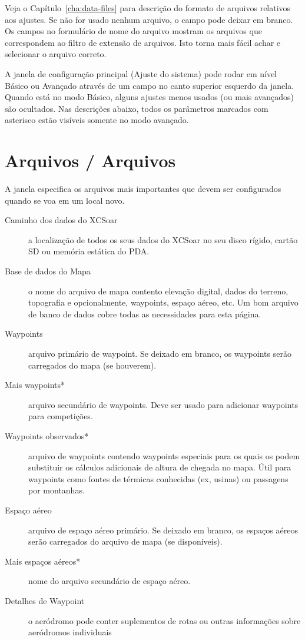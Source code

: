 Veja o Capítulo~\ref{cha:data-files} para descrição do formato de arquivos relativos aos ajustes.  Se não for usado nenhum arquivo, o campo pode deixar em branco.  Os campos no formulário de nome do arquivo mostram os arquivos que correspondem ao filtro de extensão de arquivos.  Isto torna mais fácil achar e selecionar o arquivo correto.

A janela de configuração principal (Ajuste do sistema) pode rodar em nível Básico ou Avançado através de um campo no canto superior esquerdo da janela.  
Quando está no modo Básico, alguns ajustes menos usados (ou mais avançados) são ocultados.  Nas descrições abaixo, todos os parâmetros marcados com asterisco estão visíveis somente no modo avançado.

\section{Arquivos / Arquivos}
A janela especifica os arquivos mais importantes que devem ser configurados quando se voa em um local novo.

\begin{description}
\item[Caminho dos dados do XCSoar]  a localização de todos os seus dados do XCSoar no seu disco rígido, cartão SD ou memória estática do PDA.
\item[Base de dados do Mapa]  o nome do arquivo de mapa contento elevação digital, dados do terreno, topografia e opcionalmente, waypoints, espaço aéreo, etc.  Um bom arquivo de banco de dados cobre todas as necessidades para esta página.
\item[Waypoints]  arquivo primário de waypoint.  Se deixado em branco, os waypoints serão carregados do mapa (se houverem).
\item[Mais waypoints*]  arquivo secundário de waypoints.  Deve ser usado para adicionar waypoints para competições.
\item[Waypoints observados*]  arquivo de waypoints contendo waypoints especiais para os quais os podem substituir os cálculos adicionais de altura de chegada no mapa.  Útil para waypoints como fontes de térmicas conhecidas (ex, usinas) ou passagens por montanhas.
\item[Espaço aéreo]  arquivo de espaço aéreo primário.  Se deixado em branco, os espaços aéreos serão carregados do arquivo de mapa (se disponíveis).
\item[Mais espaços aéreos*] nome do arquivo secundário de espaço aéreo.
\item[Detalhes de Waypoint] o aeródromo pode conter suplementos de rotas ou outras informações sobre aeródromos individuais
\end{description}

